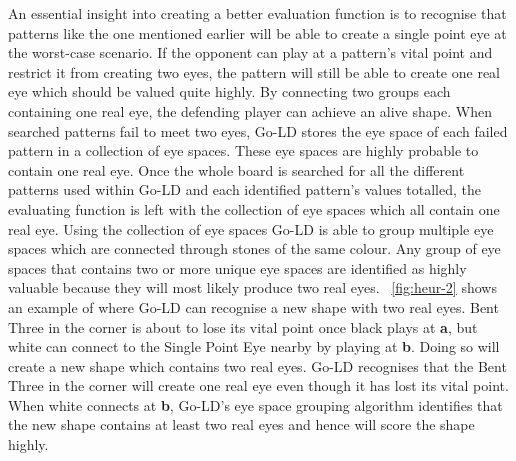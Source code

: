 \documentclass{l4proj}
\newcommand{\bo}[1]{\textbf{#1}}
\begin{document}
An essential insight into creating a better evaluation function is to recognise that patterns like the one mentioned earlier will be able to create a single point eye at the worst-case scenario. If the opponent can play at a pattern's vital point and restrict it from creating two eyes, the pattern will still be able to create one real eye which should be valued quite highly. By connecting two groups each containing one real eye, the defending player can achieve an alive shape. When searched patterns fail to meet two eyes, Go-LD stores the eye space of each failed pattern in a collection of eye spaces. These eye spaces are highly probable to contain one real eye. Once the whole board is searched for all the different patterns used within Go-LD and each identified pattern's values totalled, the evaluating function is left with the collection of eye spaces which all contain one real eye. Using the collection of eye spaces Go-LD is able to group multiple eye spaces which are connected through stones of the same colour. Any group of eye spaces that contains two or more unique eye spaces are identified as highly valuable because they will most likely produce two real eyes.
~\autoref{fig:heur-2} shows an example of where Go-LD can recognise a new shape with two real eyes. Bent Three in the corner is about to lose its vital point once black plays at \bo{a}, but white can connect to the Single Point Eye nearby by playing at \bo{b}. Doing so will create a new shape which contains two real eyes. Go-LD recognises that the Bent Three in the corner will create one real eye even though it has lost its vital point. When white connects at \bo{b}, Go-LD's eye space grouping algorithm identifies that the new shape contains at least two real eyes and hence will score the shape highly.
\end{document}
